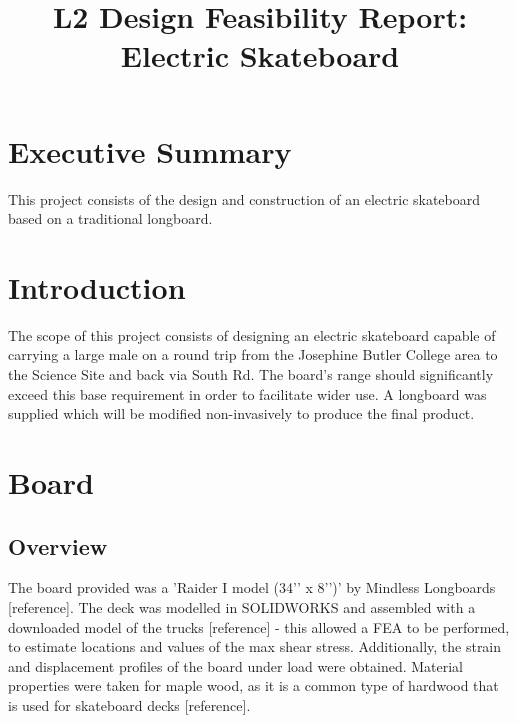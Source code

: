 \documentclass[journal,10pt]{IEEEtran}
\title{ \begin{huge}
\textbf{L2 Design Feasibility Report: Electric Skateboard} 
\end{huge} }
\begin{document}
\maketitle
\section{Executive Summary}
        This project consists of the design and construction of an electric skateboard based on a traditional longboard.
    
\section{Introduction}
        The scope of this project consists of designing an electric skateboard capable of carrying a large male on a round trip from the Josephine Butler College area to the Science Site and back via South Rd. The board's range should significantly exceed this base requirement in order to facilitate wider use. A longboard was supplied which will be modified non-invasively to produce the final product. 
\section{Board}
    \subsection{Overview}
        The board provided was a 'Raider I model (34’’ x 8’’)’ by Mindless Longboards [reference]. The deck was modelled in SOLIDWORKS and assembled with a downloaded model of the trucks [reference] - this allowed a FEA to be performed, to estimate locations and values of the max shear stress. Additionally, the strain and displacement profiles of the board under load were obtained. Material properties were taken for maple wood, as it is a common type of hardwood that is used for skateboard decks [reference].
\end{document}
